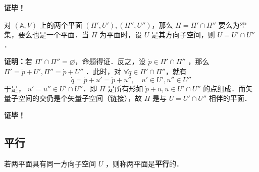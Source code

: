 \textbf{证毕！}
\begin{corollary}{}
对 $(\mathbb A,V)$ 上的两个平面 $(\Pi',U'),(\Pi'',U'')$，那么 $\Pi=\Pi'\cap\Pi''$ 要么为空集，要么也是一个平面．当 $\Pi$ 为平面时，设 $U$ 是其方向子空间，则 $U=U'\cap U''$．
\end{corollary}
\textbf{证明：}若 $\Pi'\cap\Pi''=\varnothing$，命题得证．反之，设 $\dot p\in \Pi'\cap\Pi''$ ，那么 $\Pi'=\dot p+U',\Pi''=\dot p+U''$ ．此时，对 $\forall\dot q\in\Pi'\cap\Pi''$，就有 \begin{equation}
\dot q=\dot p+u'=\dot p+u'',\quad u'\in U',u''\in U''
\end{equation}
于是， $u'=u''\in U'\cap U''$．即 $\Pi$ 是所有形如 $\dot p+u,u\in U'\cap U''$ 的点组成．而矢量子空间的交仍是个矢量子空间（链接），故 $\Pi$ 是与 $U=U'\cap U''$ 相伴的平面．

\textbf{证毕！}
\subsection{平行}

\begin{definition}{}
若两平面具有同一方向子空间 $U$ ，则称两平面是\textbf{平行}的．
\end{definition}